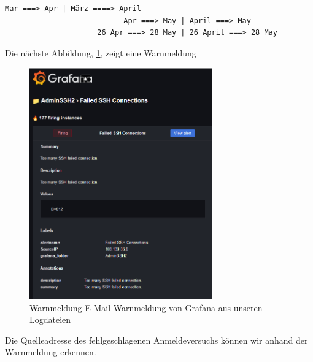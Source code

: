\begin{center}
{
\begin{Verbatim}[frame=single]
                           Mar ===> Apr | März ====> April
                           Apr ===> May | April ===> May
                     26 Apr ===> 28 May | 26 April ===> 28 May
\end{Verbatim}
}
\end{center}

Die nächste Abbildung, \ref{fig:unsereWarnmeldung1}, zeigt eine Warnmeldung 
\begin{figure}[H]
  \centering
  \includegraphics[width=0.7\textwidth]{assets/OurAlert.png}
  \caption[Warnmeldung E-Mail Warnmeldung von Grafana aus unseren Logdateien]
  {Warnmeldung E-Mail Warnmeldung von Grafana aus unseren Logdateien}
  \centering
  \label{fig:unsereWarnmeldung1}
\end{figure}

Die Quelleadresse des fehlgeschlagenen Anmeldeversuchs können wir anhand der Warnmeldung erkennen.






